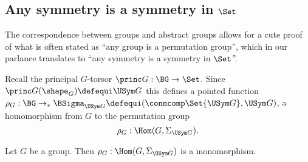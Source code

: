 \subsection{Any symmetry is a symmetry in $\Set$}
\label{sec:groupssubperm}


The correspondence between groups and abstract groups allows for a cute proof of what is often stated as ``any group is a permutation group'', which in our parlance translates to ``any symmetry is a symmetry in $\Set$''.

Recall the principal $G$-torsor $\princ G:\BG\to\Set$.
Since $\princ G(\shape_G)\defequi \USym G$ this defines a pointed function $\rho_G:\BG\to_* \BSigma_{\USym G}\defequi(\conncomp \Set {\USym G},\USym G)$,
 \ie a homomorphism from $G$ to the permutation group
$$\rho_G:\Hom(G,\Sigma_{\USym G}).$$
\begin{theorem}[Cayley]
  \label{lem:allgpsarepermutationgps}
  Let $G$ be a group. Then
  $\rho_G:\Hom(G,\Sigma_{\USym G})  $ is a monomorphism.
\end{theorem}
